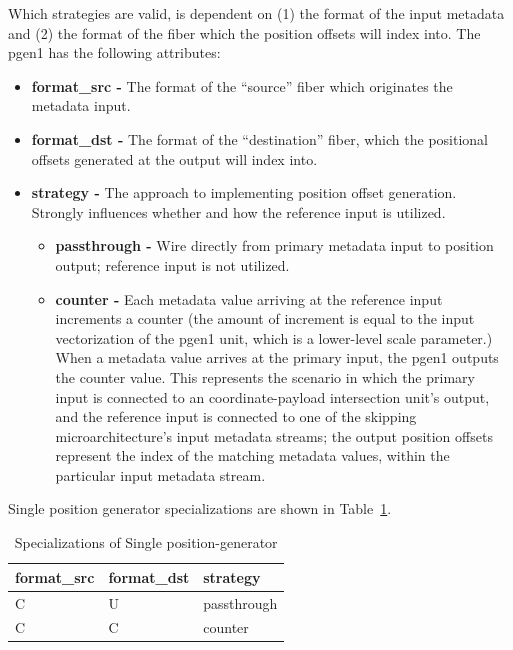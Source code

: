 Which strategies are valid, is dependent on (1) the format of the input metadata and (2) the format of the fiber which the position offsets will index into. The pgen1 has the following attributes:

\begin{itemize}
    \item \textbf{format\_src -} The format of the ``source'' fiber which originates the metadata input.
    \item \textbf{format\_dst -} The format of the ``destination'' fiber, which the positional offsets generated at the output will index into.
    \item \textbf{strategy -} The approach to implementing position offset generation. Strongly influences whether and how the reference input is utilized.
    \begin{itemize}
        \item \textbf{passthrough -} Wire directly from primary metadata input to position output; reference input is not utilized.
        \item \textbf{counter -} Each metadata value arriving at the reference input increments a counter (the amount of increment is equal to the input vectorization of the pgen1 unit, which is a lower-level scale parameter.) When a metadata value arrives at the primary input, the pgen1 outputs the counter value. This represents the scenario in which the primary input is connected to an coordinate-payload intersection unit's output, and the reference input is connected to one of the skipping microarchitecture's input metadata streams; the output position offsets represent the index of the matching metadata values, within the particular input metadata stream.
    \end{itemize}
\end{itemize}

Single position generator specializations are shown in Table~\ref{tab:SinglePositionGenerator_specializations}.

\begin{table}[H]
\centering
\begin{tabular}{lll}
\toprule
 format\_src   & format\_dst   & strategy    \\
\midrule
 C            & U            & passthrough \\
 C            & C            & counter     \\
\bottomrule
\end{tabular}
\caption{Specializations of Single position-generator}
\label{tab:SinglePositionGenerator_specializations}
\end{table}

